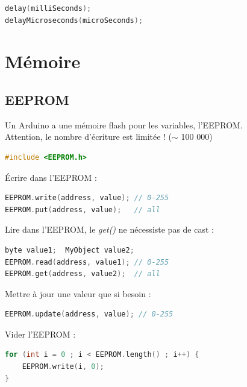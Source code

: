             \emar
            \begin{lstlisting}[language=C]
delay(milliSeconds);
delayMicroseconds(microSeconds);
            \end{lstlisting}


    \section{Mémoire}
        \subsection{EEPROM}
            \bmar
                Un Arduino a une mémoire flash pour les variables, l'EEPROM.\\
                Attention, le nombre d'écriture est limitée ! ($\sim$ 100 000)
            \emar
            \begin{lstlisting}[language=C]
#include <EEPROM.h>
            \end{lstlisting}
            \bmar
                Écrire dans l'EEPROM :
            \emar
            \begin{lstlisting}[language=C]
EEPROM.write(address, value); // 0-255
EEPROM.put(address, value);   // all
            \end{lstlisting}
            \bmar
                Lire dans l'EEPROM, le \textit{get()} ne nécessiste pas de cast :
            \emar
            \begin{lstlisting}[language=C]
byte value1;  MyObject value2;
EEPROM.read(address, value1); // 0-255
EEPROM.get(address, value2);  // all
            \end{lstlisting}
            \bmar
                Mettre à jour une valeur que si besoin :
            \emar
            \begin{lstlisting}[language=C]
EEPROM.update(address, value); // 0-255
            \end{lstlisting}
            \bmar
                Vider l'EEPROM :
            \emar
            \begin{lstlisting}[language=C]
for (int i = 0 ; i < EEPROM.length() ; i++) {
    EEPROM.write(i, 0);
}
            \end{lstlisting}


